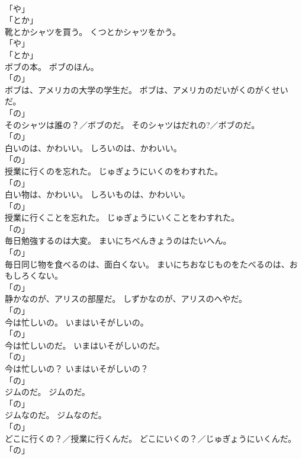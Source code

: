 \documentclass[8pt]{extreport}
\begin{document}
\begin{CJK}{UTF8}{min}
\\	「や」 
\\	「とか」 
\\	靴とかシャツを買う。	くつとかシャツをかう。	
\\	「や」 
\\	「とか」 
\\	ボブの本。	ボブのほん。	
\\	「の」 
\\	ボブは、アメリカの大学の学生だ。	ボブは、アメリカのだいがくのがくせいだ。	
\\	「の」 
\\	そのシャツは誰の？／ボブのだ。	そのシャツはだれの?／ボブのだ。	
\\	「の」 
\\	白いのは、かわいい。	しろいのは、かわいい。	
\\	「の」 
\\	授業に行くのを忘れた。	じゅぎょうにいくのをわすれた。	
\\	「の」 
\\	白い物は、かわいい。	しろいものは、かわいい。	
\\	「の」 
\\	授業に行くことを忘れた。	じゅぎょうにいくことをわすれた。	
\\	「の」 
\\	毎日勉強するのは大変。	まいにちべんきょうのはたいへん。	
\\	「の」 
\\	毎日同じ物を食べるのは、面白くない。	まいにちおなじものをたべるのは、おもしろくない。	
\\	「の」 
\\	静かなのが、アリスの部屋だ。	しずかなのが、アリスのへやだ。	
\\	「の」 
\\	今は忙しいの。	いまはいそがしいの。	
\\	「の」 
\\	今は忙しいのだ。	いまはいそがしいのだ。	
\\	「の」 
\\	今は忙しいの？	いまはいそがしいの？	
\\	「の」 
\\	ジムのだ。	ジムのだ。	
\\	「の」 
\\	ジムなのだ。	ジムなのだ。	
\\	「の」 
\\	どこに行くの？／授業に行くんだ。	どこにいくの？／じゅぎょうにいくんだ。	
\\	「の」 

\end{CJK}
\end{document}

